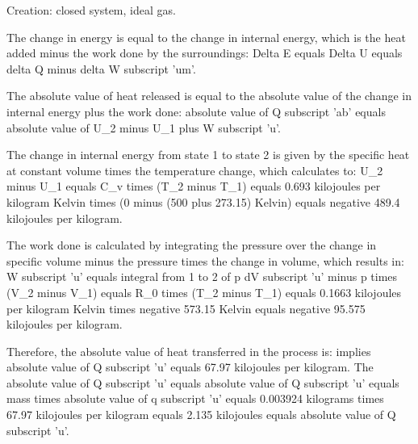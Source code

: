 Creation: closed system, ideal gas.

The change in energy is equal to the change in internal energy, which is the heat added minus the work done by the surroundings:
Delta E equals Delta U equals delta Q minus delta W subscript 'um'.

The absolute value of heat released is equal to the absolute value of the change in internal energy plus the work done:
absolute value of Q subscript 'ab' equals absolute value of U_2 minus U_1 plus W subscript 'u'.

The change in internal energy from state 1 to state 2 is given by the specific heat at constant volume times the temperature change, which calculates to:
U_2 minus U_1 equals C_v times (T_2 minus T_1) equals 0.693 kilojoules per kilogram Kelvin times (0 minus (500 plus 273.15) Kelvin) equals negative 489.4 kilojoules per kilogram.

The work done is calculated by integrating the pressure over the change in specific volume minus the pressure times the change in volume, which results in:
W subscript 'u' equals integral from 1 to 2 of p dV subscript 'u' minus p times (V_2 minus V_1) equals R_0 times (T_2 minus T_1) equals 0.1663 kilojoules per kilogram Kelvin times negative 573.15 Kelvin equals negative 95.575 kilojoules per kilogram.

Therefore, the absolute value of heat transferred in the process is:
implies absolute value of Q subscript 'u' equals 67.97 kilojoules per kilogram.
The absolute value of Q subscript 'u' equals absolute value of Q subscript 'u' equals mass times absolute value of q subscript 'u' equals 0.003924 kilograms times 67.97 kilojoules per kilogram equals 2.135 kilojoules equals absolute value of Q subscript 'u'.
